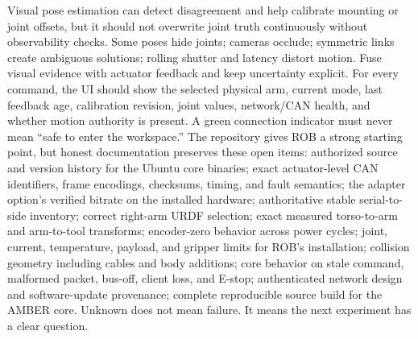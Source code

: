 {}Visual pose estimation can detect disagreement and help calibrate mounting or joint offsets, but it should not overwrite joint truth continuously without observability checks. Some poses hide joints; cameras occlude; symmetric links create ambiguous solutions; rolling shutter and latency distort motion. Fuse visual evidence with actuator feedback and keep uncertainty explicit.\markdownRendererParagraphSeparator
{}For every command, the UI should show the selected physical arm, current mode, last feedback age, calibration revision, joint values, network/CAN health, and whether motion authority is present. A green connection indicator must never mean “safe to enter the workspace.”\markdownRendererInterblockSeparator
{}
\markdownRendererSectionEnd \markdownRendererSectionBegin
{}\markdownRendererInterblockSeparator
{}The repository gives ROB a strong starting point, but honest documentation preserves these open items:\markdownRendererInterblockSeparator
{}\markdownRendererUlBegin
\markdownRendererUlItem authorized source and version history for the Ubuntu core binaries;\markdownRendererUlItemEnd 
\markdownRendererUlItem exact actuator-level CAN identifiers, frame encodings, checksums, timing, and fault semantics;\markdownRendererUlItemEnd 
\markdownRendererUlItem the adapter option's verified bitrate on the installed hardware;\markdownRendererUlItemEnd 
\markdownRendererUlItem authoritative stable serial-to-side inventory;\markdownRendererUlItemEnd 
\markdownRendererUlItem correct right-arm URDF selection;\markdownRendererUlItemEnd 
\markdownRendererUlItem exact measured torso-to-arm and arm-to-tool transforms;\markdownRendererUlItemEnd 
\markdownRendererUlItem encoder-zero behavior across power cycles;\markdownRendererUlItemEnd 
\markdownRendererUlItem joint, current, temperature, payload, and gripper limits for ROB's installation;\markdownRendererUlItemEnd 
\markdownRendererUlItem collision geometry including cables and body additions;\markdownRendererUlItemEnd 
\markdownRendererUlItem core behavior on stale command, malformed packet, bus-off, client loss, and E-stop;\markdownRendererUlItemEnd 
\markdownRendererUlItem authenticated network design and software-update provenance;\markdownRendererUlItemEnd 
\markdownRendererUlItem complete reproducible source build for the AMBER core.\markdownRendererUlItemEnd 
\markdownRendererUlEnd \markdownRendererInterblockSeparator
{}Unknown does not mean failure. It means the next experiment has a clear question.\markdownRendererInterblockSeparator
{}
\markdownRendererSectionEnd \markdownRendererSectionBegin
